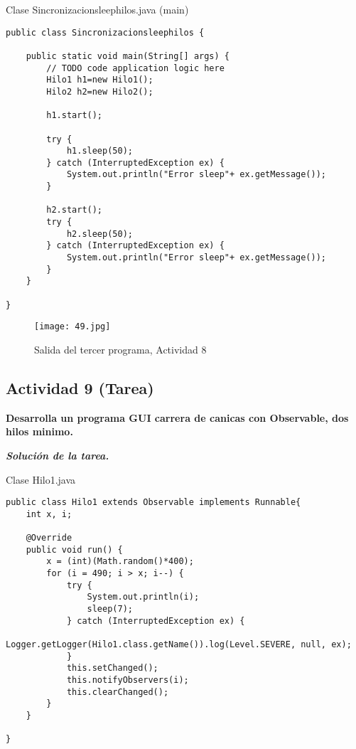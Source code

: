 \begin{center}
Clase Sincronizacionsleephilos.java (main)
\end{center}

\begin{verbatim}
public class Sincronizacionsleephilos {

    public static void main(String[] args) {
        // TODO code application logic here
        Hilo1 h1=new Hilo1();
        Hilo2 h2=new Hilo2();
        
        h1.start();
        
        try {
            h1.sleep(50);
        } catch (InterruptedException ex) {
            System.out.println("Error sleep"+ ex.getMessage());
        }
        
        h2.start();
        try {
            h2.sleep(50);
        } catch (InterruptedException ex) {
            System.out.println("Error sleep"+ ex.getMessage());
        }      
    }
    
}
\end{verbatim} \vspace{1cm}
\begin{figure}[h!]
		\centering
		{\texttt{[image: 49.jpg]}\par} 
		\caption{Salida del tercer programa, Actividad 8}\vspace{1cm}
\end{figure}

{\raggedright
\subsection{Actividad 9 (Tarea)}
}\vspace{.5cm}

\textbf{Desarrolla un programa GUI carrera de canicas con Observable, dos hilos minimo.}\vspace{.2mm}

\textbf{\textit{Solución de la tarea.}}

\begin{center}
Clase Hilo1.java
\end{center}

\begin{verbatim}
public class Hilo1 extends Observable implements Runnable{
    int x, i;

    @Override
    public void run() {
        x = (int)(Math.random()*400);
        for (i = 490; i > x; i--) {
            try {
                System.out.println(i);
                sleep(7);
            } catch (InterruptedException ex) {
                Logger.getLogger(Hilo1.class.getName()).log(Level.SEVERE, null, ex);
            }
            this.setChanged();
            this.notifyObservers(i);
            this.clearChanged();
        }
    }
    
}
\end{verbatim} \newpage


